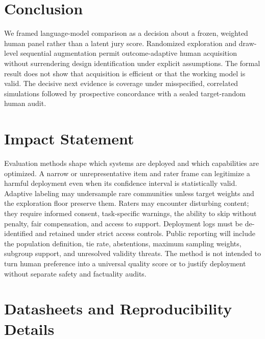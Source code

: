 \documentclass{article}
\begin{document}
\section{Conclusion}
\label{sec:conclusion}

We framed language-model comparison as a decision about a frozen, weighted
human panel rather than a latent jury score. Randomized exploration and
draw-level sequential augmentation permit outcome-adaptive human acquisition
without surrendering design identification under explicit assumptions. The
formal result does not show that acquisition is efficient or that the working
model is valid. The decisive next evidence is coverage under misspecified,
correlated simulations followed by prospective concordance with a sealed target-random human
audit.


\section*{Impact Statement}

Evaluation methods shape which systems are deployed and which capabilities are
optimized. A narrow or unrepresentative item and rater frame can legitimize a
harmful deployment even when its confidence interval is statistically valid.
Adaptive labeling may undersample rare communities unless target weights and
the exploration floor preserve them. Raters may encounter disturbing content;
they require informed consent, task-specific warnings, the ability to skip
without penalty, fair compensation, and access to support. Deployment logs
must be de-identified and retained under strict access controls. Public
reporting will include the population definition, tie rate, abstentions,
maximum sampling weights, subgroup support, and unresolved validity threats.
The method is not intended to turn human preference into a universal quality
score or to justify deployment without separate safety and factuality audits.




\clearpage
\appendix
\onecolumn

\section{Datasheets and Reproducibility Details}
\label{app:datasheet}
\end{document}
